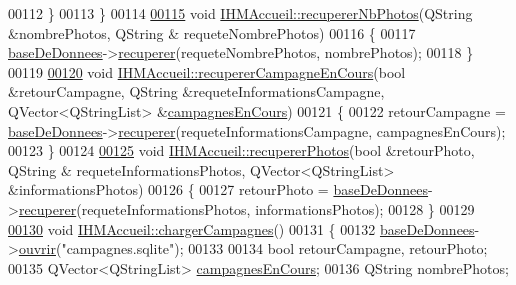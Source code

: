 \begin{DoxyCode}
00112     \}
00113 \}
00114 
\hyperlink{class_i_h_m_accueil_aa09878b2e3e3024220291165b5c528a6}{00115} \textcolor{keywordtype}{void} \hyperlink{class_i_h_m_accueil_aa09878b2e3e3024220291165b5c528a6}{IHMAccueil::recupererNbPhotos}(QString &nombrePhotos, QString &
      requeteNombrePhotos)
00116 \{
00117     \hyperlink{class_i_h_m_accueil_ab56d9846c071396a92f88272880e2c1f}{baseDeDonnees}->\hyperlink{class_base_de_donnees_a77539baad389f5acf754cd2cd452403e}{recuperer}(requeteNombrePhotos, nombrePhotos);
00118 \}
00119 
\hyperlink{class_i_h_m_accueil_a0ffb0f0c7c9c613083933514690f2772}{00120} \textcolor{keywordtype}{void} \hyperlink{class_i_h_m_accueil_a0ffb0f0c7c9c613083933514690f2772}{IHMAccueil::recupererCampagneEnCours}(\textcolor{keywordtype}{bool} &retourCampagne, QString
       &requeteInformationsCampagne, QVector<QStringList> &\hyperlink{class_i_h_m_accueil_ad3827b81480eb201b5927c16a2ad1c46}{campagnesEnCours})
00121 \{
00122     retourCampagne = \hyperlink{class_i_h_m_accueil_ab56d9846c071396a92f88272880e2c1f}{baseDeDonnees}->\hyperlink{class_base_de_donnees_a77539baad389f5acf754cd2cd452403e}{recuperer}(requeteInformationsCampagne, 
      campagnesEnCours);
00123 \}
00124 
\hyperlink{class_i_h_m_accueil_aebeef48b9bc345edd02e5185951c454e}{00125} \textcolor{keywordtype}{void} \hyperlink{class_i_h_m_accueil_aebeef48b9bc345edd02e5185951c454e}{IHMAccueil::recupererPhotos}(\textcolor{keywordtype}{bool} &retourPhoto, QString &
      requeteInformationsPhotos, QVector<QStringList> &informationsPhotos)
00126 \{
00127     retourPhoto = \hyperlink{class_i_h_m_accueil_ab56d9846c071396a92f88272880e2c1f}{baseDeDonnees}->\hyperlink{class_base_de_donnees_a77539baad389f5acf754cd2cd452403e}{recuperer}(requeteInformationsPhotos, 
      informationsPhotos);
00128 \}
00129 
\hyperlink{class_i_h_m_accueil_a1ed3efefdf929c0d2a6b6d1bb10bbc27}{00130} \textcolor{keywordtype}{void} \hyperlink{class_i_h_m_accueil_a1ed3efefdf929c0d2a6b6d1bb10bbc27}{IHMAccueil::chargerCampagnes}()
00131 \{
00132     \hyperlink{class_i_h_m_accueil_ab56d9846c071396a92f88272880e2c1f}{baseDeDonnees}->\hyperlink{class_base_de_donnees_a7f6a5510b08017b0d99115a84252f186}{ouvrir}(\textcolor{stringliteral}{"campagnes.sqlite"});
00133 
00134     \textcolor{keywordtype}{bool} retourCampagne, retourPhoto;
00135     QVector<QStringList> \hyperlink{class_i_h_m_accueil_ad3827b81480eb201b5927c16a2ad1c46}{campagnesEnCours};
00136     QString nombrePhotos;

\end{DoxyCode}
